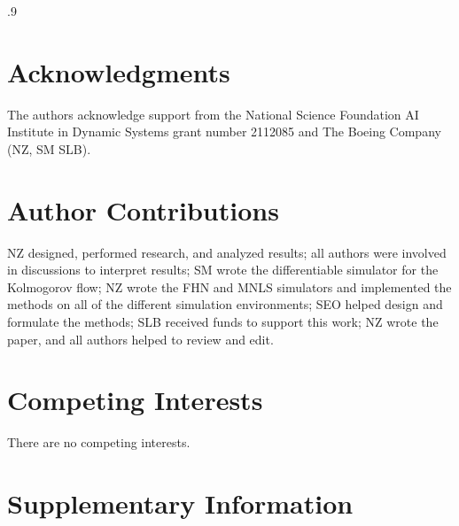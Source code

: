 \documentclass[twocolumn,10pt]{article}
\begin{document}

 \begin{spacing}{.9}
 \small{
 \setlength{\bibsep}{4.8pt}
 
 }
 \end{spacing}


\section*{Acknowledgments}
The authors acknowledge support from the National Science Foundation AI Institute in Dynamic Systems
grant number 2112085 and The Boeing Company (NZ, SM SLB).


\section*{Author Contributions}
NZ designed, performed research, and analyzed results;
%
all authors were involved in discussions to interpret results;
%
SM wrote the differentiable simulator for the Kolmogorov flow; 
%
NZ wrote the FHN and MNLS simulators and implemented the methods on all of the different simulation environments;
%
SEO helped design and formulate the methods;
%
SLB received funds to support this work;
%
NZ wrote the paper, and all authors helped to review and edit. 

\section*{Competing Interests}
There are no competing interests.

\clearpage
\onecolumn
\setcounter{section}{0}\setcounter{figure}{0}\setcounter{equation}{0}\setcounter{table}{0}
\renewcommand{\thesection}{S-\arabic{section}}
\renewcommand{\thesubsection}{S-\arabic{section}\Alph{subsection}}
\renewcommand{\theequation}{S-\arabic{equation}}
\renewcommand{\figurename}{Supplementary Figure}
\renewcommand{\tablename}{Supplementary Table}
\section*{Supplementary Information}
\startcontents[supp]
\clearpage

\setcounter{section}{0}\setcounter{figure}{0}\setcounter{equation}{0}\setcounter{table}{0}
\renewcommand{\thesection}{S-\arabic{section}}
\renewcommand{\thesubsection}{S-\arabic{section}\Alph{subsection}}
\end{document}
